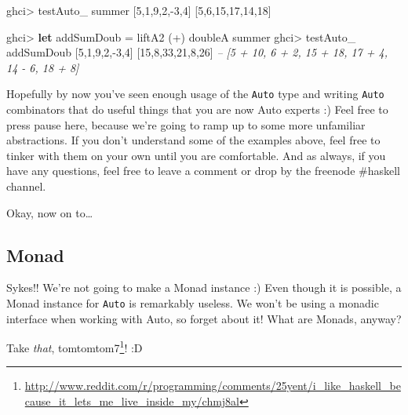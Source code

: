 \documentclass[]{article}
\newenvironment{Shaded}{}{}
\newcommand{\CommentTok}[1]{\textcolor[rgb]{0.38,0.63,0.69}{\textit{#1}}}
\newcommand{\DecValTok}[1]{\textcolor[rgb]{0.25,0.63,0.44}{#1}}
\newcommand{\FunctionTok}[1]{\textcolor[rgb]{0.02,0.16,0.49}{#1}}
\newcommand{\KeywordTok}[1]{\textcolor[rgb]{0.00,0.44,0.13}{\textbf{#1}}}
\newcommand{\NormalTok}[1]{#1}
\renewcommand{\href}[2]{#2\footnote{\url{#1}}}
\begin{document}
\begin{Shaded}
\begin{Highlighting}[]
\NormalTok{ghci}\FunctionTok{>}\NormalTok{ testAuto_ summer [}\DecValTok{5}\NormalTok{,}\DecValTok{1}\NormalTok{,}\DecValTok{9}\NormalTok{,}\DecValTok{2}\NormalTok{,}\FunctionTok{-}\DecValTok{3}\NormalTok{,}\DecValTok{4}\NormalTok{]}
\NormalTok{[}\DecValTok{5}\NormalTok{,}\DecValTok{6}\NormalTok{,}\DecValTok{15}\NormalTok{,}\DecValTok{17}\NormalTok{,}\DecValTok{14}\NormalTok{,}\DecValTok{18}\NormalTok{]}

\NormalTok{ghci}\FunctionTok{>} \KeywordTok{let}\NormalTok{ addSumDoub }\FunctionTok{=}\NormalTok{ liftA2 (}\FunctionTok{+}\NormalTok{) doubleA summer}
\NormalTok{ghci}\FunctionTok{>}\NormalTok{ testAuto_ addSumDoub [}\DecValTok{5}\NormalTok{,}\DecValTok{1}\NormalTok{,}\DecValTok{9}\NormalTok{,}\DecValTok{2}\NormalTok{,}\FunctionTok{-}\DecValTok{3}\NormalTok{,}\DecValTok{4}\NormalTok{]}
\NormalTok{[}\DecValTok{15}\NormalTok{,}\DecValTok{8}\NormalTok{,}\DecValTok{33}\NormalTok{,}\DecValTok{21}\NormalTok{,}\DecValTok{8}\NormalTok{,}\DecValTok{26}\NormalTok{]}
\CommentTok{-- [5 + 10, 6 + 2, 15 + 18, 17 + 4, 14 - 6, 18 + 8]}
\end{Highlighting}
\end{Shaded}

Hopefully by now you've seen enough usage of the \texttt{Auto} type and writing
\texttt{Auto} combinators that do useful things that you are now Auto experts :)
Feel free to press pause here, because we're going to ramp up to some more
unfamiliar abstractions. If you don't understand some of the examples above,
feel free to tinker with them on your own until you are comfortable. And as
always, if you have any questions, feel free to leave a comment or drop by the
freenode \#haskell channel.

Okay, now on to\ldots{}

\hypertarget{monad}{%
\subsection{Monad}\label{monad}}

Sykes!! We're not going to make a Monad instance :) Even though it is possible,
a Monad instance for \texttt{Auto} is remarkably useless. We won't be using a
monadic interface when working with Auto, so forget about it! What are Monads,
anyway?

Take \emph{that},
\href{http://www.reddit.com/r/programming/comments/25yent/i_like_haskell_because_it_lets_me_live_inside_my/chmj8al}{tomtomtom7}!
:D
\end{document}
